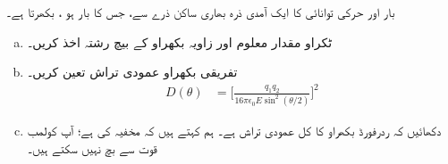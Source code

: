  بار  اور حرکی توانائی  کا ایک آمدی ذرہ  بھاری ساکن ذرے سے،  جس کا بار  ہو ،  بکھرتا ہے۔
\begin{enumerate}[a.]
\item
ٹکراو مقدار معلوم اور زاویہ بکھراو کے بیچ رشتہ اخذ کریں۔

 
\item
 تفریقی بکھراو عمودی تراش تعین کریں۔ 
\begin{align}\label{مساوات_بکھراو_تفریقی_بکھراو_عمودی_تراش}
D(\theta)&=\big[\frac{q_1q_2}{16\pi\epsilon_0E\sin^2(\theta/2)}\big]^2
\end{align}
\item
 دکھائیں کہ ردرفورڈ بکھراو کا کل عمودی تراش   ہے۔ ہم کہتے ہیں کہ   مخفیہ کی     ہے؛  آپ کولمب قوت سے بچ نہیں سکتے ہیں۔
 \end{enumerate}


